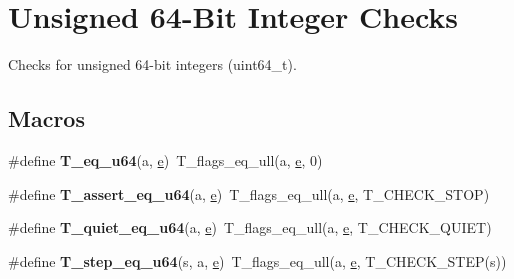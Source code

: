 \hypertarget{group__RTEMSTestFrameworkChecksUInt64}{}\section{Unsigned 64-\/Bit Integer Checks}
\label{group__RTEMSTestFrameworkChecksUInt64}


Checks for unsigned 64-\/bit integers (uint64\+\_\+t).  


\subsection*{Macros}
\begin{DoxyCompactItemize}
\item 
\mbox{\label{group__RTEMSTestFrameworkChecksUInt64_gafd774714ce33aa101ffe341d4bcb486e}} 
\#define {\bfseries T\+\_\+eq\+\_\+u64}(a,  \mbox{\hyperlink{sun4u_2tte_8h_a8b0b9ed08e0e18920ec2682f48228c27}{e}})~T\+\_\+flags\+\_\+eq\+\_\+ull(a, \mbox{\hyperlink{sun4u_2tte_8h_a8b0b9ed08e0e18920ec2682f48228c27}{e}}, 0)
\item 
\mbox{\label{group__RTEMSTestFrameworkChecksUInt64_ga5b169948c3a78aa66a493301f98a6c09}} 
\#define {\bfseries T\+\_\+assert\+\_\+eq\+\_\+u64}(a,  \mbox{\hyperlink{sun4u_2tte_8h_a8b0b9ed08e0e18920ec2682f48228c27}{e}})~T\+\_\+flags\+\_\+eq\+\_\+ull(a, \mbox{\hyperlink{sun4u_2tte_8h_a8b0b9ed08e0e18920ec2682f48228c27}{e}}, T\+\_\+\+C\+H\+E\+C\+K\+\_\+\+S\+T\+OP)
\item 
\mbox{\label{group__RTEMSTestFrameworkChecksUInt64_ga3f3ed4768f22c307809483580c6eec1b}} 
\#define {\bfseries T\+\_\+quiet\+\_\+eq\+\_\+u64}(a,  \mbox{\hyperlink{sun4u_2tte_8h_a8b0b9ed08e0e18920ec2682f48228c27}{e}})~T\+\_\+flags\+\_\+eq\+\_\+ull(a, \mbox{\hyperlink{sun4u_2tte_8h_a8b0b9ed08e0e18920ec2682f48228c27}{e}}, T\+\_\+\+C\+H\+E\+C\+K\+\_\+\+Q\+U\+I\+ET)
\item 
\mbox{\label{group__RTEMSTestFrameworkChecksUInt64_gabc4e7f509dde683ad976b0d48545c9db}} 
\#define {\bfseries T\+\_\+step\+\_\+eq\+\_\+u64}(s,  a,  \mbox{\hyperlink{sun4u_2tte_8h_a8b0b9ed08e0e18920ec2682f48228c27}{e}})~T\+\_\+flags\+\_\+eq\+\_\+ull(a, \mbox{\hyperlink{sun4u_2tte_8h_a8b0b9ed08e0e18920ec2682f48228c27}{e}}, T\+\_\+\+C\+H\+E\+C\+K\+\_\+\+S\+T\+EP(s))

\end{DoxyCompactItemize}
